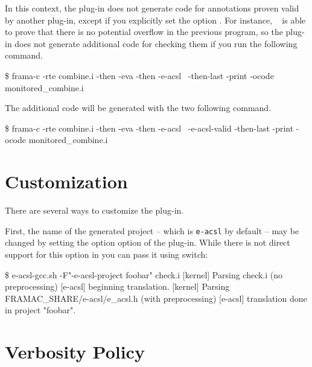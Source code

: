 In this context, the \eacsl plug-in does not generate code for annotations
proven valid by another plug-in, except if you explicitly set the option
. For instance, \Eva~\cite{eva} is able to
prove that there is no potential overflow in the previous program, so the \eacsl
plug-in does not generate additional code for checking them if you run the
following command.
\begin{frama-c-commands}
\$ frama-c -rte combine.i -then -eva -then -e-acsl \
  -then-last -print -ocode monitored_combine.i
\end{frama-c-commands}
The additional code will be generated with the two following command.
\begin{frama-c-commands}
\$ frama-c -rte combine.i -then -eva -then -e-acsl \
  -e-acsl-valid -then-last -print -ocode monitored_combine.i
\end{frama-c-commands}

\section{Customization} %
\label{sec:custom}

There are several ways to customize the \eacsl plug-in.

First, the name of the generated project -- which is \texttt{e-acsl} by default
-- may be changed by setting the option  option of the
\eacsl plug-in. While there is not direct support for this option in \eacslgcc
you can pass it using \shortopt{F} switch:


\begin{logs}
\$ e-acsl-gcc.sh -F"-e-acsl-project foobar" check.i
[kernel] Parsing check.i (no preprocessing)
[e-acsl] beginning translation.
[kernel] Parsing FRAMAC_SHARE/e-acsl/e_acsl.h (with preprocessing)
[e-acsl] translation done in project "foobar".
\end{logs}

\section{Verbosity Policy} %
\label{sec:verbose}

